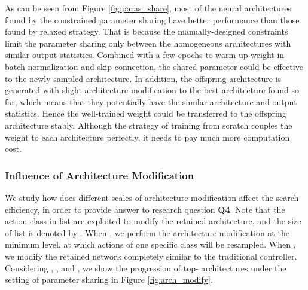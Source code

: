 \documentclass[sigconf]{acmart}
\begin{document}
As can be seen from Figure \ref{fig:paras_share}, most of the neural architectures found by the constrained parameter sharing have better performance than those found by relaxed strategy. That is because the manually-designed constraints limit the parameter sharing only between the homogeneous architectures with similar output statistics. Combined with a few epochs to warm up weight in batch normalization and skip connection, the shared parameter could be effective to the newly sampled architecture. In addition, the offspring architecture is generated with slight architecture modification to the best architecture found so far, which means that they potentially have the similar architecture and output statistics. Hence the well-trained weight could be transferred to the offspring architecture stably. Although the strategy of training from scratch couples the weight to each architecture perfectly, it needs to pay much more computation cost. 
\begin{figure*}
\centering
\hspace{-.3cm}
\vspace{-.35cm}
\caption{The progression of top- averaged performance of AGNN under different architecture modification: , and .}
\label{fig:arch_modify}
\end{figure*}
\subsubsection{\textbf{Influence of Architecture Modification}}
We study how does different scales of architecture modification affect the search efficiency, in order to provide answer to research question \textbf{Q4}. Note that the action class in list  are exploited to modify the retained architecture, and the size of list  is denoted by . When , we perform the architecture modification at the minimum level, at which actions of one specific class will be resampled. When , we modify the retained network completely similar to the traditional controller. Considering , , and , we show the progression of top- architectures under the setting of parameter sharing in Figure \ref{fig:arch_modify}.
\end{document}
